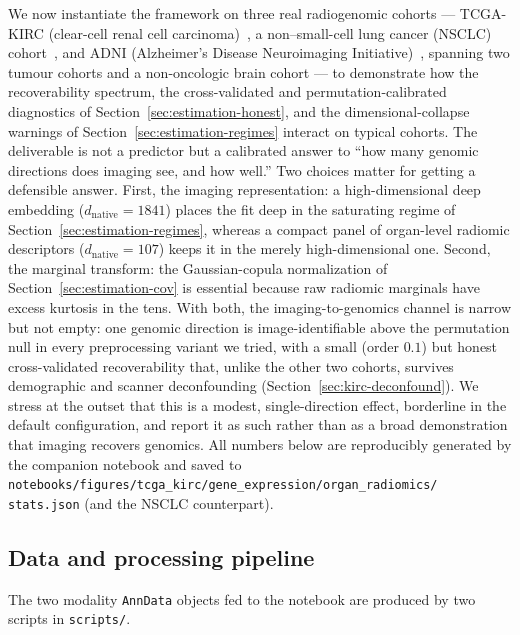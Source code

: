 \documentclass{article}
\begin{document}
We now instantiate the framework on three real radiogenomic cohorts ---
TCGA-KIRC (clear-cell renal cell carcinoma)~\citep{ricketts2018tcgakirc}, a
non--small-cell lung cancer (NSCLC) cohort~\citep{bakr2018nsclcradiogenomics},
and ADNI (Alzheimer's Disease Neuroimaging Initiative)~\citep{petersen2010adni},
spanning two tumour cohorts and a non-oncologic brain cohort
--- to demonstrate how the recoverability spectrum, the cross-validated and
permutation-calibrated diagnostics of Section~\ref{sec:estimation-honest}, and
the dimensional-collapse warnings of Section~\ref{sec:estimation-regimes}
interact on typical cohorts. The deliverable is not a predictor but a calibrated
answer to ``how many genomic directions does imaging see, and how well.'' Two
choices matter for getting a defensible answer. First, the imaging
representation: a high-dimensional deep embedding ($d_{\mathrm{native}}=1841$)
places the fit deep in the saturating regime of
Section~\ref{sec:estimation-regimes}, whereas a compact panel of organ-level
radiomic descriptors ($d_{\mathrm{native}}=107$) keeps it in the merely
high-dimensional one. Second, the marginal transform: the Gaussian-copula
normalization of Section~\ref{sec:estimation-cov} is essential because raw
radiomic marginals have excess kurtosis in the tens. With both, the
imaging-to-genomics channel is narrow but not empty: one genomic direction
is image-identifiable above the permutation null in every preprocessing
variant we tried, with a small (order $0.1$) but honest cross-validated
recoverability that, unlike the other two cohorts, survives demographic and
scanner deconfounding (Section~\ref{sec:kirc-deconfound}). We stress at the
outset that this is a modest, single-direction effect, borderline in the default
configuration, and report it as such rather than as a broad demonstration that
imaging recovers genomics. All
numbers below are reproducibly generated by the companion notebook and saved to
\texttt{notebooks/figures/tcga\_kirc/gene\_expression/organ\_radiomics/%
stats.json} (and the NSCLC counterpart).

\subsection{Data and processing pipeline}
\label{sec:kirc-pipeline}
The two modality \texttt{AnnData} objects fed to the notebook are produced by
two scripts in \texttt{scripts/}.
\end{document}
